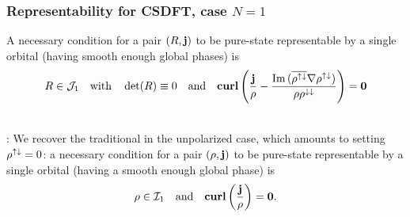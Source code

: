 \documentclass[9pt,xcolor=dvipsnames]{beamer}
\begin{document}
\begin{frame}

\frametitle{Representability for CSDFT, case $N =1$}


\begin{lemma}[DG]
	A necessary condition for a pair $(R, {\bold j})$ to be pure-state representable by a single orbital (having smooth enough global phases) is\footnotemark
	\[
		R \in {\mathcal J}_1 \quad \text{with} \quad \det(R) \equiv 0
		\quad \text{and} \quad
		\textbf{curl} \left( \dfrac{{\bold j}}{\rho} - \dfrac{{\mathrm{Im }\, }( \overline{\rho^{{\uparrow} {\downarrow}}} {\nabla \rho^{{\uparrow} {\downarrow}}})}{\rho \rho^{{\downarrow} {\downarrow}}} \right) = {\bold 0}
	\]
\end{lemma}
~\\
: We recover the traditional  in the unpolarized case, which amounts to setting $\rho^{{\uparrow} {\downarrow}} = 0$: a necessary condition for a pair $(\rho, {\bold j})$ to be pure-state representable by a single orbital (having a smooth enough global phase) is 
\[
	 \rho \in {\mathcal I}_1
	 \quad \text{and} \quad
	 \textbf{curl} \left( \dfrac{{\bold j}}{\rho} \right) = {\bold 0} .
\]

\addtocounter{footnote}{-1}


\end{frame}



\end{document}
